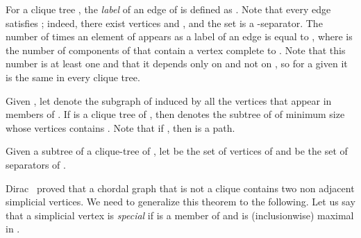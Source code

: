 \documentclass[11pt]{article}
\begin{document}
For a clique tree , the \emph{label} of an edge  of  is
defined as .  Note that every edge  satisfies
; indeed, there exist vertices  and , and the set  is a -separator.  The number of times an element  of 
appears as a label of an edge is equal to , where  is the
number of components of  that contain a vertex complete
to  \cite{Gav74,MacMac}.  Note that this number is at least one and
that it depends only on  and not on , so for a given  it is the same in every clique tree.

Given , let  denote the subgraph of 
induced by all the vertices that appear in members of .  If  is
a clique tree of , then  denotes the subtree of  of
minimum size whose vertices contains .  Note that if , then
 is a path.

Given a subtree  of a clique-tree  of , let 
be the set of vertices of  and  be the set of
separators of .

Dirac~\cite{Dir61} proved that a chordal graph that is not a clique
contains two non adjacent simplicial vertices.  We need to generalize
this theorem to the following.  Let us say that a simplicial vertex
 is \emph{special} if  is a member of  and is
(inclusionwise) maximal in .
\end{document}
